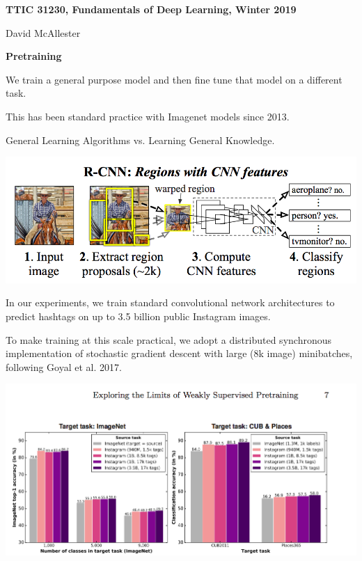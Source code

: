 





{\Huge
  \centerline{\bf TTIC 31230,  Fundamentals of Deep Learning, Winter 2019}
  \vfill
  \centerline{David McAllester}
  \vfill
  \centerline{\bf Pretraining}



\vfill
We train a general purpose model and then fine tune that model on a different task.

\vfill
This has been standard practice with Imagenet models since 2013.

\vfill
General Learning Algorithms vs. Learning General Knowledge.


\centerline{\includegraphics[width=10.0 in]{../images/R-CNN}}


In our experiments, we train standard convolutional network architectures to
predict hashtags on up to 3.5 billion public Instagram images.

\vfill
To make training at this scale practical, we adopt a distributed synchronous implementation of
stochastic gradient descent with large (8k image) minibatches, following Goyal et al. 2017.


\centerline{\includegraphics[width=10.0 in]{../images/InstagramPre}}

}
